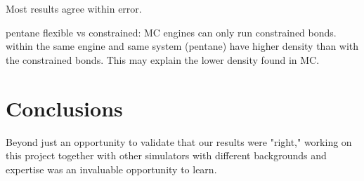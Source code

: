 Most results agree within error.

pentane flexible vs constrained: MC engines can only run constrained bonds. within the same engine and same system (pentane) have higher density than with the constrained bonds. This may explain the lower density found in MC.


\section{Conclusions}

Beyond just an opportunity to validate that our results were "right," working on this project together with other simulators with different backgrounds and expertise was an invaluable opportunity to learn.

